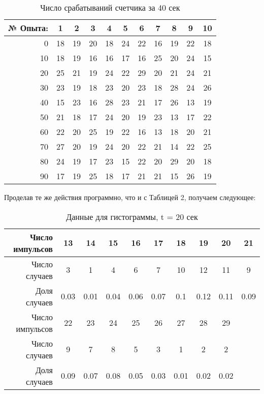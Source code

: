 \documentclass[a4paper, 12pt]{article}
\begin{document}
\begin{table}[H]
	\centering
	\begin{tabular}{|r|c|c|c|c|c|c|c|c|c|c|}
		\hline
		№ Опыта: & 1 & 2 & 3 & 4 & 5 & 6 & 7 & 8 & 9 & 10     \\ \hline
			
		0   & 18 & 19 & 20 & 18 & 24 & 22 & 16 & 19 & 22 & 18 \\ \hline
		10  & 18 & 19 & 16 & 16 & 17 & 16 & 25 & 20 & 24 & 15 \\ \hline
		20  & 25 & 21 & 19 & 24 & 22 & 29 & 20 & 21 & 24 & 21 \\ \hline
		30  & 23 & 19 & 18 & 23 & 20 & 23 & 18 & 28 & 24 & 26 \\ \hline
		40  & 15 & 23 & 16 & 28 & 23 & 21 & 17 & 26 & 13 & 19 \\ \hline
		50  & 21 & 18 & 17 & 24 & 20 & 19 & 23 & 13 & 17 & 22 \\ \hline
		60  & 22 & 20 & 25 & 19 & 22 & 16 & 13 & 18 & 20 & 21 \\ \hline
		70  & 27 & 20 & 19 & 24 & 20 & 22 & 21 & 14 & 22 & 25 \\ \hline
		80  & 24 & 19 & 17 & 23 & 15 & 22 & 20 & 29 & 20 & 18 \\ \hline
		90  & 17 & 19 & 25 & 18 & 17 & 21 & 21 & 15 & 26 & 19 \\ \hline
		\end{tabular}
	\caption{Число срабатываний счетчика за 40 сек}
\end{table}

Проделав те же действия программно, что и с Таблицей 2, получаем следующее:

\begin{table}[H]
	\centering
	\begin{tabular}{|r|c|c|c|c|c|c|c|c|c|}
		\hline
		Число импульсов & 13 & 14 & 15 & 16 & 17 & 18 & 19 & 20 & 21 \\ \hline
		
		Число случаев & 3 & 1 & 4 & 6 & 7 & 10 & 12 & 11 & 9  \\ \hline  
		
		Доля случаев & 0.03 & 0.01 & 0.04 & 0.06 & 0.07 & 0.1 & 0.12 & 0.11 & 0.09 \\ \hline 	
	
		Число импульсов & 22 & 23 & 24 & 25 & 26 & 27 & 28 & 29 & \\ \hline
		
		Число случаев & 9 & 7 & 8 & 5 & 3 & 1 & 2 & 2 & \\ \hline  
		
		Доля случаев & 0.09 & 0.07 & 0.08 & 0.05 & 0.03 & 0.01 & 0.02 & 0.02 &  \\ \hline 	
	\end{tabular}
	\caption{Данные для гистограммы, t = 20 сек}
\end{table} 
\end{document}
